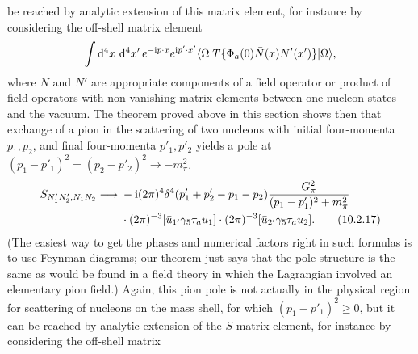 be reached by analytic extension of this matrix element, for instance by
considering the off-shell matrix element
\[
  \int \mathop{}\!\mathrm{d}^4x\,\mathop{}\!\mathrm{d}^4x'\,e^{-\mathrm{i} p\cdot x}e^{\mathrm{i} p'\cdot x'}
  \langle \Omega\rvert T\{\Phi_a(0)\bar N(x)N'(x')\}\lvert \Omega\rangle,
\]
where $N$ and $N'$ are appropriate components of a field operator or
product of field operators with non-vanishing matrix elements between
one-nucleon states and the vacuum. The theorem proved above in this
section shows then that exchange of a pion in the scattering of two
nucleons with initial four-momenta $p_1,p_2$, and final four-momenta $p'_1,p'_2$
yields a pole at $(p_1-p'_1)^2=(p_2-p'_2)^2\to-m_\pi^2$.
\begin{align}
  S_{N'_1N'_2,N_1N_2}\longrightarrow{}&
  -\mathrm{i}(2\pi)^4\delta^4(p'_1+p'_2-p_1-p_2)
  \frac{G_\pi^2}{(p_1-p'_1)^2+m_\pi^2}
  \notag\\
  &\cdot(2\pi)^{-3}[\bar u_{1'}\gamma_5\tau_a u_1]
  \cdot(2\pi)^{-3}[\bar u_{2'}\gamma_5\tau_a u_2].
  \tag{10.2.17}\label{eq:10.2.17}
\end{align}
(The easiest way to get the phases and numerical factors right in such
formulas is to use Feynman diagrams; our theorem just says that the pole
structure is the same as would be found in a field theory in which the
Lagrangian involved an elementary pion field.) Again, this pion pole is
not actually in the physical region for scattering of nucleons on the mass
shell, for which $(p_1-p'_1)^2\geq0$, but it can be reached by analytic extension
of the $S$-matrix element, for instance by considering the off-shell matrix
